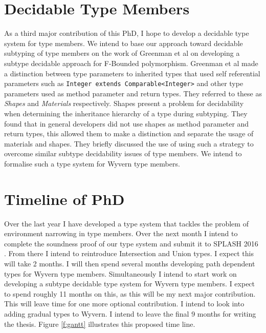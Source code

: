 \documentclass[11pt
              , a4paper
              , twoside
              , openright
              ]{report}
\numberwithin{case}{theorem}
\numberwithin{subcase}{case}
\begin{document}
\section{Decidable Type Members}
As a third major contribution of this PhD, I hope to develop a decidable type system for type members. We intend to base our approach toward decidable subtyping of type members on the work of Greenman et al \cite{Greenman:2014:GFP:2594291.2594308} on developing a subtype decidable approach for F-Bounded polymorphism. Greenman et al made a distinction between type parameters to inherited types that used self referential parameters such as \verb|Integer extends Comparable<Integer>| and other type parameters used as method parameter and return types. They referred to these as \emph{Shapes} and \emph{Materials} respectively. Shapes present a problem for decidability when determining the inheritance hierarchy of a type during subtyping. They found that in general developers did not use shapes as method parameter and return types, this allowed them to make a distinction and separate the usage of materials and shapes. They briefly discussed the use of using such a strategy to overcome similar subtype decidability issues of type members. We intend to formalise such a type system for Wyvern type members.

\section{Timeline of PhD}
Over the last year I have developed a type system that tackles the problem of environment narrowing in type members. Over the next month I intend to complete the soundness proof of our type system and submit it to SPLASH 2016 \cite{splash2016}. From there I intend to reintroduce Intersection and Union types. I expect this will take 2 months. I will then spend several months developing path dependent types for Wyvern type members. Simultaneously I intend to start work on developing a subtype decidable type system for Wyvern type members. I expect to spend roughly 11 months on this, as this will be my next major contribution. This will leave time for one more optional contribution. I intend to look into adding gradual types to Wyvern. I intend to leave the final 9 months for writing the thesis. Figure \ref{f:gantt} illustrates this proposed time line.
\end{document}
